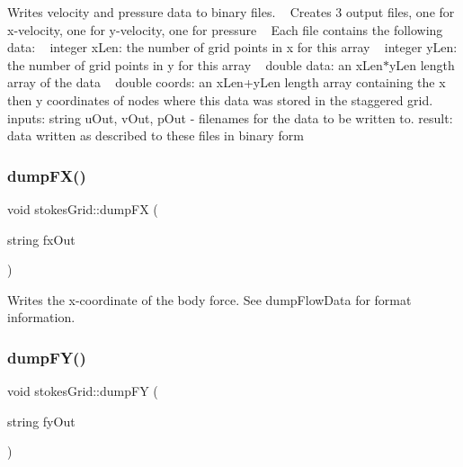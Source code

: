 Writes velocity and pressure data to binary files. ~\newline
Creates 3 output files, one for x-\/velocity, one for y-\/velocity, one for pressure ~\newline
Each file contains the following data\+: ~\newline
integer x\+Len\+: the number of grid points in x for this array ~\newline
integer y\+Len\+: the number of grid points in y for this array ~\newline
double data\+: an x\+Len$\ast$y\+Len length array of the data ~\newline
double coords\+: an x\+Len+y\+Len length array containing the x then y coordinates of nodes where this data was stored in the staggered grid. ~\newline
~\newline
inputs\+: string u\+Out, v\+Out, p\+Out -\/ filenames for the data to be written to. result\+: data written as described to these files in binary form \mbox{\label{classstokesGrid_aa8b37287725d1688dbdf21dde31d0058}} 
\subsubsection{\texorpdfstring{dump\+F\+X()}{dumpFX()}}
{\footnotesize\ttfamily void stokes\+Grid\+::dump\+FX (\begin{DoxyParamCaption}\item[{string}]{fx\+Out }\end{DoxyParamCaption})}

Writes the x-\/coordinate of the body force. See dump\+Flow\+Data for format information. \mbox{\label{classstokesGrid_aeb5e12ba43e9e4ce2433b1cca7ac28e3}} 
\subsubsection{\texorpdfstring{dump\+F\+Y()}{dumpFY()}}
{\footnotesize\ttfamily void stokes\+Grid\+::dump\+FY (\begin{DoxyParamCaption}\item[{string}]{fy\+Out }\end{DoxyParamCaption})}

